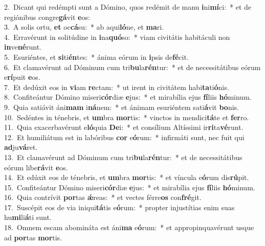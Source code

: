 {2.~}Dicant qui redémpti sunt a Dómino, quos redémit de manu \textbf{i}ni\textbf{mí}ci:~* et de regiónibus congre\textbf{gá}vit \textbf{e}os:\\
{3.~}A solis ortu, \textbf{et} oc\textbf{cá}su:~* ab aqui\textbf{ló}ne, et \textbf{ma}ri.\\
{4.~}Erravérunt in solitúdine in \textbf{i}na\textbf{quó}so:~* viam civitátis habitáculi non \textbf{in}ve\textbf{né}runt.\\
{5.~}Esuriéntes, et \textbf{si}ti\textbf{én}tes:~* ánima eórum in \textbf{i}psis de\textbf{fé}cit.\\
{6.~}Et clamavérunt ad Dóminum cum tri\textbf{bu}la\textbf{rén}tur:~* et de necessitátibus eórum e\textbf{rí}puit \textbf{e}os.\\
{7.~}Et dedúxit eos in \textbf{vi}am \textbf{re}ctam:~* ut irent in civitátem habi\textbf{ta}ti\textbf{ó}nis.\\
{8.~}Confiteántur Dómino miseri\textbf{cór}diæ \textbf{e}jus:~* et mirabília ejus \textbf{fí}liis \textbf{hó}minum.\\
{9.~}Quia satiávit áni\textbf{mam} i\textbf{ná}nem:~* et ánimam esuriéntem sati\textbf{á}vit \textbf{bo}nis.\\
{10.~}Sedéntes in ténebris, et \textbf{um}bra \textbf{mor}tis:~* vinctos in mendici\textbf{tá}te et \textbf{fer}ro.\\
{11.~}Quia exacerbavérunt e\textbf{ló}quia \textbf{De}i:~* et consílium Altíssimi ir\textbf{ri}ta\textbf{vé}runt.\\
{12.~}Et humiliátum est in labóribus \textbf{cor} e\textbf{ó}rum:~* infirmáti sunt, nec fuit qui \textbf{ad}ju\textbf{vá}ret.\\
{13.~}Et clamavérunt ad Dóminum cum tri\textbf{bu}la\textbf{rén}tur:~* et de necessitátibus eórum libe\textbf{rá}vit \textbf{e}os.\\
{14.~}Et edúxit eos de ténebris, et \textbf{um}bra \textbf{mor}tis:~* et víncula e\textbf{ó}rum dis\textbf{rú}pit.\\
{15.~}Confiteántur Dómino miseri\textbf{cór}diæ \textbf{e}jus:~* et mirabília ejus \textbf{fí}liis \textbf{hó}minum.\\
{16.~}Quia contrívit \textbf{por}tas \textbf{ǽ}reas:~* et vectes férre\textbf{os} con\textbf{fré}git.\\
{17.~}Suscépit eos de via iniqui\textbf{tá}tis e\textbf{ó}rum:~* propter injustítias enim suas hu\textbf{mi}li\textbf{á}ti sunt.\\
{18.~}Omnem escam abomináta est áni\textbf{ma} e\textbf{ó}rum:~* et appropinquavérunt usque ad \textbf{por}tas \textbf{mor}tis.\\
